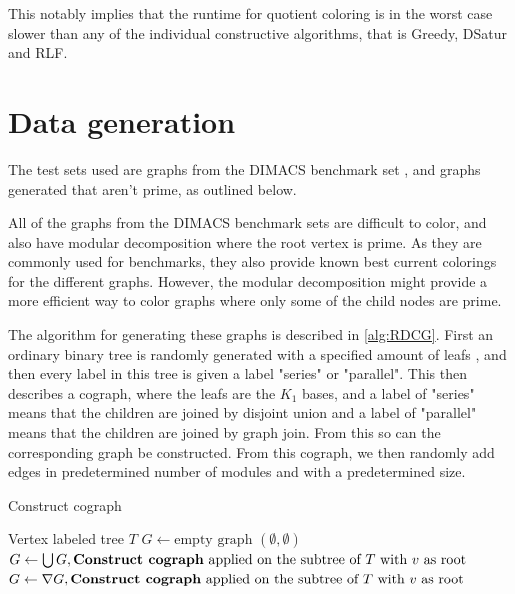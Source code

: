 \documentclass[a4paper]{article}
\begin{document}
This notably implies that the runtime for quotient coloring is in the worst 
case slower than any of the individual constructive algorithms, that is 
Greedy, DSatur and RLF.
\section{Data generation}
\label{sec:Data}

The test sets used are graphs from the DIMACS benchmark set \cite{DIMACS}, 
and graphs generated that aren't prime, as outlined below.

All of the graphs from the DIMACS benchmark sets are difficult to color,
and also have modular decomposition where the root vertex is prime. As they are
commonly used for benchmarks, they also provide known best current colorings for the
different graphs. However, the modular decomposition might provide a more
efficient way to color graphs where only some of the child nodes are prime. 

The algorithm for generating these graphs is described in \autoref{alg:RDCG}.
First an ordinary binary tree is randomly generated with a specified amount of
leafs , and then every label in this tree is given a label "series" or
"parallel".  This then describes a cograph, where the leafs are the $K_1$ bases,
and a label of "series" means that the children are joined by disjoint union and
a label of "parallel" means that the children are joined by graph join.  From
this so can the corresponding graph be constructed. From this cograph, we then
randomly add edges in predetermined number of modules and with a predetermined
size. 

\begin{algorithm}[H]
    \caption{Construct cograph}
   \begin{algorithmic}[1]
        \REQUIRE Vertex labeled tree $T$
        \ENDIF
        \STATE $G \leftarrow \text{empty graph $(\emptyset,\emptyset)$}$
                \STATE $G \leftarrow \bigcup G, \text{\textbf{Construct cograph} applied
                on the subtree of $T$ with $v$ as root} $
                \STATE $G \leftarrow \nabla G, \text{\textbf{Construct cograph} applied
                on the subtree of $T$ with $v$ as root}$
            \ENDIF
        \ENDFOR
    \end{algorithmic}
\end{algorithm}
\end{document}
